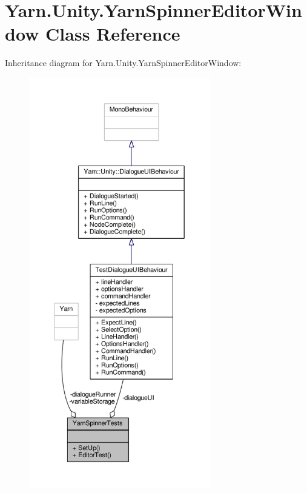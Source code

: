 \hypertarget{a00085}{\section{Yarn.\-Unity.\-Yarn\-Spinner\-Editor\-Window Class Reference}
\label{a00085}
}


Inheritance diagram for Yarn.\-Unity.\-Yarn\-Spinner\-Editor\-Window\-:
\nopagebreak
\begin{figure}[H]
\begin{center}
\leavevmode
\includegraphics[width=224pt]{d2/d45/a00342}
\end{center}
\end{figure}



